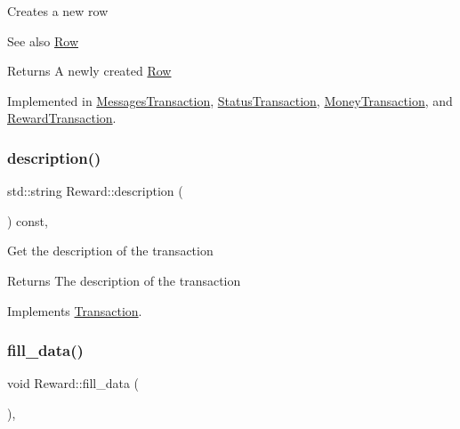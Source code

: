 Creates a new row \begin{DoxySeeAlso}{See also}
\mbox{\hyperlink{classRow}{Row}}
\end{DoxySeeAlso}
\begin{DoxyReturn}{Returns}
A newly created \mbox{\hyperlink{classRow}{Row}} 
\end{DoxyReturn}


Implemented in \mbox{\hyperlink{classMessagesTransaction_a3eec18f09aa102b3cee7f215c225a8fb}{Messages\+Transaction}}, \mbox{\hyperlink{classStatusTransaction_adbd4d2730ccd884e64f9a6bd30487a3c}{Status\+Transaction}}, \mbox{\hyperlink{classMoneyTransaction_a53b636ba053baae7705976efce629d21}{Money\+Transaction}}, and \mbox{\hyperlink{classRewardTransaction_ad43c1d706406f40d43f433b0d0b0b510}{Reward\+Transaction}}.

\mbox{\label{classReward_a95e98fc9dbbc9da47cee243adc1932d2}} 
\subsubsection{\texorpdfstring{description()}{description()}}
{\footnotesize\ttfamily std\+::string Reward\+::description (\begin{DoxyParamCaption}{ }\end{DoxyParamCaption}) const\hspace{0.3cm}{\ttfamily [final]}, {\ttfamily [virtual]}}

Get the description of the transaction

\begin{DoxyReturn}{Returns}
The description of the transaction 
\end{DoxyReturn}


Implements \mbox{\hyperlink{classTransaction_ad27fb61fcd91863c57ba96a7159b4e8a}{Transaction}}.

\mbox{\label{classReward_a30a40e2eefd0aea969fab46d1e22d145}} 
\subsubsection{\texorpdfstring{fill\+\_\+data()}{fill\_data()}}
{\footnotesize\ttfamily void Reward\+::fill\+\_\+data (\begin{DoxyParamCaption}{ }\end{DoxyParamCaption})\hspace{0.3cm}{\ttfamily [final]}, {\ttfamily [virtual]}}

